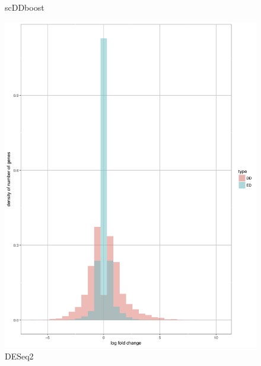 \documentclass[11pt]{amsart}
\begin{document}
\begin{figure}[H]
  \caption{scDDboost}\label{fig:scDDboost}
\endminipage\hfill
{}%
  \includegraphics[width=\linewidth]{DEC_NPC_des.png}
  \caption{DESeq2}\label{fig:DESeq2}
\endminipage
\end{figure}
\end{document}
